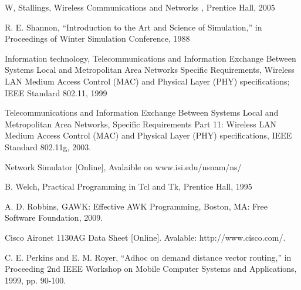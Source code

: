 \documentclass{jtetiproposalskripsi}
\begin{document}

\begin{thebibliography}{9}

W, Stallings, Wireless Communications and Networks , Prentice Hall, 2005

R. E. Shannon, “Introduction to the Art and Science of Simulation,” in Proceedings of Winter Simulation Conference, 1988

Information technology, Telecommunications and Information Exchange Between Systems Local and Metropolitan Area Networks  Specific Requirements, Wireless LAN Medium Access Control (MAC) and Physical Layer (PHY) specifications; IEEE Standard 802.11, 1999

Telecommunications and Information Exchange Between Systems Local and Metropolitan Area Networks, Specific Requirements Part 11: Wireless LAN Medium Access Control (MAC) and Physical Layer (PHY) specifications, IEEE Standard 802.11g, 2003.

Network Simulator [Online], Avalaible on www.isi.edu/nsnam/ns/

B. Welch, Practical Programming in Tcl and Tk, Prentice Hall, 1995

A. D. Robbins, GAWK: Effective AWK Programming, Boston, MA: Free Software Foundation, 2009.

Cisco Aironet 1130AG Data Sheet [Online]. Avalable: http://www.cisco.com/.

C. E. Perkins and E. M. Royer, “Adhoc on demand distance vector routing,” in Proceeding 2nd IEEE Workshop on Mobile Computer Systems and Applications, 1999, pp. 90-100.

\end{thebibliography}
\end{document}
